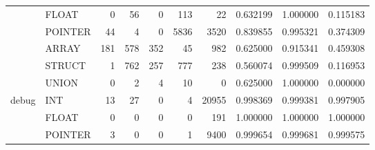 \begin{tabular}{llrrrrrrrr}
      & FLOAT &                                  0 &                                56 &                                0 &                               113 &                              22 &                        0.632199 &                               1.000000 &                             0.115183 \\
      & POINTER &                                 44 &                                 4 &                                0 &                              5836 &                            3520 &                        0.839855 &                               0.995321 &                             0.374309 \\
      & ARRAY &                                181 &                               578 &                              352 &                                45 &                             982 &                        0.625000 &                               0.915341 &                             0.459308 \\
      & STRUCT &                                  1 &                               762 &                              257 &                               777 &                             238 &                        0.560074 &                               0.999509 &                             0.116953 \\
      & UNION &                                  0 &                                 2 &                                4 &                                10 &                               0 &                        0.625000 &                               1.000000 &                             0.000000 \\
\cline{1-10}
\multirow{6}{*}{debug} & INT &                                 13 &                                27 &                                0 &                                 4 &                           20955 &                        0.998369 &                               0.999381 &                             0.997905 \\
      & FLOAT &                                  0 &                                 0 &                                0 &                                 0 &                             191 &                        1.000000 &                               1.000000 &                             1.000000 \\
      & POINTER &                                  3 &                                 0 &                                0 &                                 1 &                            9400 &                        0.999654 &                               0.999681 &                             0.999575 \\

\end{tabular}
